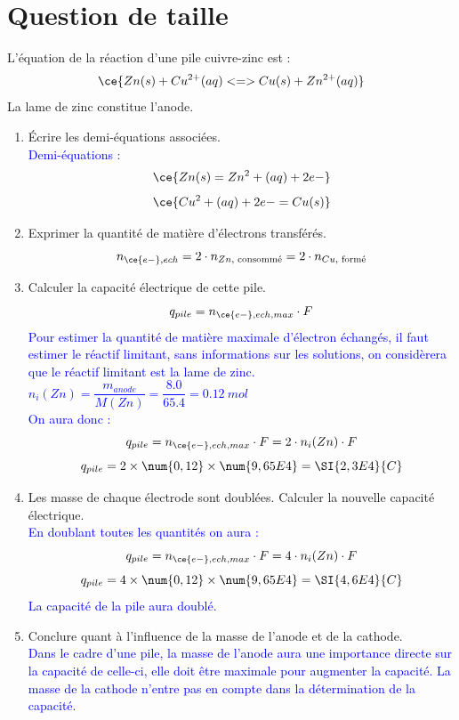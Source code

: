 \documentclass[a4paper,11pt,fleqn]{article}%
\begin{document}
\section{Question de taille}
L'équation de la réaction d'une pile cuivre-zinc est :
$$\ce{Zn(s) + Cu^{2+}(aq) <=> Cu(s) + Zn^{2+}(aq)}$$
La lame de zinc constitue l'anode.
\begin{enumerate}
    \item Écrire les demi-équations associées.\\
    \textcolor{blue}{Demi-équations : $$\ce{Zn(s) = Zn^2+(aq) + 2e-}$$ $$\ce{Cu^2+(aq) +2e- = Cu(s)}$$}
    \item Exprimer la quantité de matière d'électrons transférés.\\
    \textcolor{blue}{$$n_{\ce{e-},ech} = 2 \cdot n_{Zn\text{, consommé}} = 2 \cdot n_{Cu\text{, formé}}$$}
    \item Calculer la capacité électrique de cette pile.\\
    \textcolor{blue}{$$q_{pile} = n_{\ce{e-},ech, max} \cdot F$$
    Pour estimer la quantité de matière maximale d'électron échangés, il faut estimer le réactif limitant, sans informations sur les solutions, on considèrera que le réactif limitant est la lame de zinc.\\ $n_i(Zn) = \dfrac{m_{anode}}{M(Zn)} = \dfrac{\num{8,0}}{\num{65,4}} = \SI{0,12}{mol}$\\
    On aura donc :
    $$q_{pile} = n_{\ce{e-},ech, max} \cdot F = 2 \cdot n_{i}(Zn) \cdot F$$
    $$q_{pile} = 2 \times \num{0,12} \times \num{9,65E4} = \SI{2,3E4}{C}$$}
    \item Les masse de chaque électrode sont doublées. Calculer la nouvelle capacité électrique.\\
    \textcolor{blue}{En doublant toutes les quantités on aura :
    $$q_{pile} = n_{\ce{e-},ech, max} \cdot F = 4 \cdot n_{i}(Zn) \cdot F$$
    $$q_{pile} = 4 \times \num{0,12} \times \num{9,65E4} = \SI{4,6E4}{C}$$
    La capacité de la pile aura doublé.}
    \item Conclure quant à l'influence de la masse de l'anode et de la cathode.\\
    \textcolor{blue}{Dans le cadre d'une pile, la masse de l'anode aura une importance directe sur la capacité de celle-ci, elle doit être maximale pour augmenter la capacité. La masse de la cathode n'entre pas en compte dans la détermination de la capacité.}
\end{enumerate}
\end{document}
